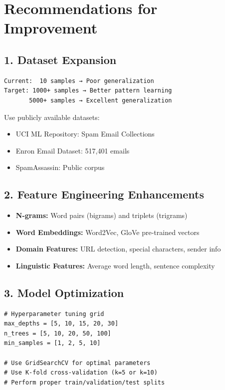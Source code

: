 \documentclass[14pt,a4paper]{report}
\begin{document}
\section{Recommendations for Improvement}

\subsection{1. Dataset Expansion}

\begin{verbatim}
Current:  10 samples → Poor generalization
Target: 1000+ samples → Better pattern learning
       5000+ samples → Excellent generalization
\end{verbatim}

Use publicly available datasets:
\begin{itemize}
    \item UCI ML Repository: Spam Email Collections
    \item Enron Email Dataset: 517,401 emails
    \item SpamAssassin: Public corpus
\end{itemize}

\subsection{2. Feature Engineering Enhancements}

\begin{itemize}
    \item \textbf{N-grams:} Word pairs (bigrams) and triplets (trigrams)
    \item \textbf{Word Embeddings:} Word2Vec, GloVe pre-trained vectors
    \item \textbf{Domain Features:} URL detection, special characters, sender info
    \item \textbf{Linguistic Features:} Average word length, sentence complexity
\end{itemize}

\subsection{3. Model Optimization}

\begin{lstlisting}
# Hyperparameter tuning grid
max_depths = [5, 10, 15, 20, 30]
n_trees = [5, 10, 20, 50, 100]
min_samples = [1, 2, 5, 10]

# Use GridSearchCV for optimal parameters
# Use K-fold cross-validation (k=5 or k=10)
# Perform proper train/validation/test splits
\end{lstlisting}
\end{document}
